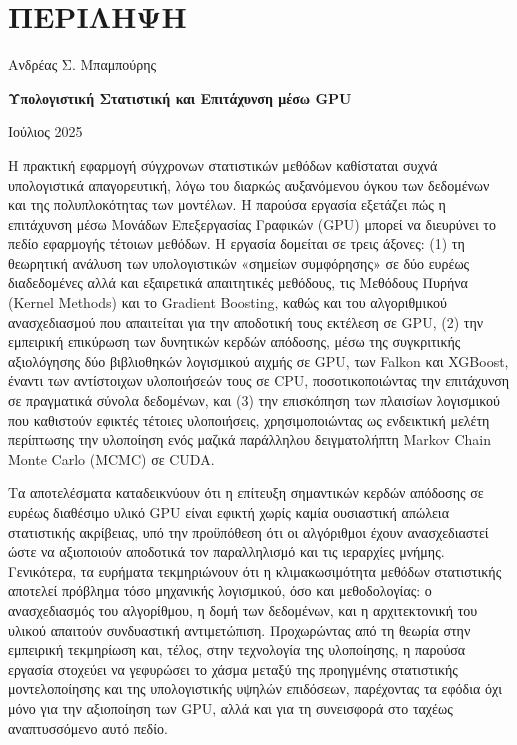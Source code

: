 \newpage

\chapter*{ΠΕΡΙΛΗΨΗ}

\vspace*{0.5cm}

\noindent Ανδρέας Σ. Μπαμπούρης

\vspace{0.5cm}

\noindent\textbf{Υπολογιστική Στατιστική και Επιτάχυνση μέσω GPU}

\vspace{0.25cm}

\noindent\hfill Ιούλιος 2025

\vspace{1cm}

Η πρακτική εφαρμογή σύγχρονων στατιστικών μεθόδων καθίσταται συχνά υπολογιστικά απαγορευτική, λόγω του διαρκώς αυξανόμενου όγκου των δεδομένων και της πολυπλοκότητας των μοντέλων. Η παρούσα εργασία εξετάζει πώς η επιτάχυνση μέσω Μονάδων Επεξεργασίας Γραφικών (GPU) μπορεί να διευρύνει το πεδίο εφαρμογής τέτοιων μεθόδων. Η εργασία δομείται σε τρεις άξονες: (1) τη θεωρητική ανάλυση των υπολογιστικών «σημείων συμφόρησης» σε δύο ευρέως διαδεδομένες αλλά και εξαιρετικά απαιτητικές μεθόδους, τις Μεθόδους Πυρήνα (Kernel Methods) και το Gradient Boosting, καθώς και του αλγοριθμικού ανασχεδιασμού που απαιτείται για την αποδοτική τους εκτέλεση σε GPU, (2) την εμπειρική επικύρωση των δυνητικών κερδών απόδοσης, μέσω της συγκριτικής αξιολόγησης δύο βιβλιοθηκών λογισμικού αιχμής σε GPU, των Falkon και XGBoost, έναντι των αντίστοιχων υλοποιήσεών τους σε CPU, ποσοτικοποιώντας την επιτάχυνση σε πραγματικά σύνολα δεδομένων, και (3) την επισκόπηση των πλαισίων λογισμικού που καθιστούν εφικτές τέτοιες υλοποιήσεις, χρησιμοποιώντας ως ενδεικτική μελέτη περίπτωσης την υλοποίηση ενός μαζικά παράλληλου δειγματολήπτη Markov Chain Monte Carlo (MCMC) σε CUDA.

Τα αποτελέσματα καταδεικνύουν ότι η επίτευξη σημαντικών κερδών απόδοσης σε ευρέως διαθέσιμο υλικό GPU είναι εφικτή χωρίς καμία ουσιαστική απώλεια στατιστικής ακρίβειας, υπό την προϋπόθεση ότι οι αλγόριθμοι έχουν ανασχεδιαστεί ώστε να αξιοποιούν αποδοτικά τον παραλληλισμό και τις ιεραρχίες μνήμης. Γενικότερα, τα ευρήματα τεκμηριώνουν ότι η κλιμακωσιμότητα μεθόδων στατιστικής αποτελεί πρόβλημα τόσο μηχανικής λογισμικού, όσο και μεθοδολογίας: ο ανασχεδιασμός του αλγορίθμου, η δομή των δεδομένων, και η αρχιτεκτονική του υλικού απαιτούν συνδυαστική αντιμετώπιση. Προχωρώντας από τη θεωρία στην εμπειρική τεκμηρίωση και, τέλος, στην τεχνολογία της υλοποίησης, η παρούσα εργασία στοχεύει να γεφυρώσει το χάσμα μεταξύ της προηγμένης στατιστικής μοντελοποίησης και της υπολογιστικής υψηλών επιδόσεων, παρέχοντας τα εφόδια όχι μόνο για την αξιοποίηση των GPU, αλλά και για τη συνεισφορά στο ταχέως αναπτυσσόμενο αυτό πεδίο.

\newpage
